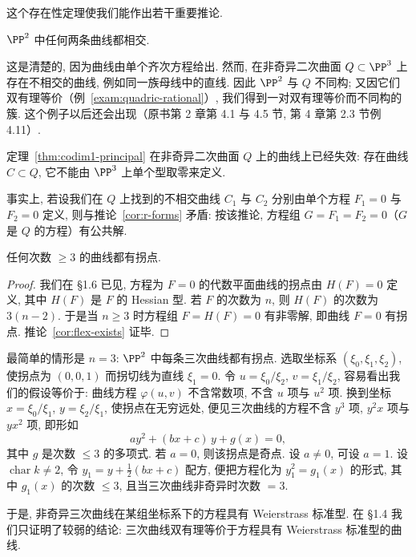 这个存在性定理使我们能作出若干重要推论.

\begin{corollary}\label{cor:curves-meet}
	$\PP^2$ 中任何两条曲线都相交.
\end{corollary}

这是清楚的, 因为曲线由单个齐次方程给出. 然而, 在非奇异二次曲面 $Q \subset \PP^3$ 上存在不相交的曲线, 例如同一族母线中的直线. 因此 $\PP^2$ 与 $Q$ 不同构; 又因它们双有理等价（例~\ref{exam:quadric-rational}）, 我们得到一对双有理等价而不同构的簇. 这个例子以后还会出现（原书第 2 章第 4.1 与 4.5 节, 第 4 章第 2.3 节例 4.11）.

\begin{corollary}\label{cor:thm121-fails}
	定理~\ref{thm:codim1-principal} 在非奇异二次曲面 $Q$ 上的曲线上已经失效: 存在曲线 $C \subset Q$, 它不能由 $\PP^3$ 上单个型取零来定义.
\end{corollary}

事实上, 若设我们在 $Q$ 上找到的不相交曲线 $C_1$ 与 $C_2$ 分别由单个方程 $F_1 = 0$ 与 $F_2 = 0$ 定义, 则与推论~\ref{cor:r-forms} 矛盾: 按该推论, 方程组 $G = F_1 = F_2 = 0$（$G$ 是 $Q$ 的方程）有公共解.

\begin{corollary}\label{cor:flex-exists}
	任何次数 $\ge 3$ 的曲线都有拐点.
\end{corollary}

\begin{proof}
	我们在 §1.6 已见, 方程为 $F = 0$ 的代数平面曲线的拐点由 $H(F) = 0$ 定义, 其中 $H(F)$ 是 $F$ 的 Hessian 型. 若 $F$ 的次数为 $n$, 则 $H(F)$ 的次数为 $3(n-2)$. 于是当 $n \ge 3$ 时方程组 $F = H(F) = 0$ 有非零解, 即曲线 $F = 0$ 有拐点. 推论~\ref{cor:flex-exists} 证毕.
\end{proof}

最简单的情形是 $n = 3$: $\PP^2$ 中每条三次曲线都有拐点. 选取坐标系 $(\xi_0, \xi_1, \xi_2)$, 使拐点为 $(0, 0, 1)$ 而拐切线为直线 $\xi_1 = 0$. 令 $u = \xi_0/\xi_2$, $v = \xi_1/\xi_2$, 容易看出我们的假设等价于: 曲线方程 $\varphi(u, v)$ 不含常数项, 不含 $u$ 项与 $u^2$ 项. 换到坐标 $x = \xi_0/\xi_1$, $y = \xi_2/\xi_1$, 使拐点在无穷远处, 便见三次曲线的方程不含 $y^3$ 项, $y^2 x$ 项与 $y x^2$ 项, 即形如
\[
	a y^2 + (bx + c)\, y + g(x) = 0,
\]
其中 $g$ 是次数 $\le 3$ 的多项式. 若 $a = 0$, 则该拐点是奇点. 设 $a \ne 0$, 可设 $a = 1$. 设 $\operatorname{char} k \ne 2$, 令 $y_1 = y + \tfrac{1}{2}(bx + c)$ 配方, 便把方程化为 $y_1^2 = g_1(x)$ 的形式, 其中 $g_1(x)$ 的次数 $\le 3$, 且当三次曲线非奇异时次数 $= 3$.

于是, 非奇异三次曲线在某组坐标系下的方程具有 Weierstrass 标准型. 在 §1.4 我们只证明了较弱的结论: 三次曲线双有理等价于方程具有 Weierstrass 标准型的曲线.

